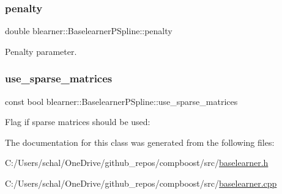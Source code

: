 \subsubsection{\texorpdfstring{penalty}{penalty}}
{\footnotesize\ttfamily double blearner\+::\+Baselearner\+P\+Spline\+::penalty\hspace{0.3cm}{\ttfamily [private]}}



Penalty parameter. 

\mbox{\label{classblearner_1_1_baselearner_p_spline_abc38580ee231aa0173fdea22bb9b2283}} 
\subsubsection{\texorpdfstring{use\+\_\+sparse\+\_\+matrices}{use\_sparse\_matrices}}
{\footnotesize\ttfamily const bool blearner\+::\+Baselearner\+P\+Spline\+::use\+\_\+sparse\+\_\+matrices\hspace{0.3cm}{\ttfamily [private]}}



Flag if sparse matrices should be used\+: 



The documentation for this class was generated from the following files\+:\begin{DoxyCompactItemize}
\item 
C\+:/\+Users/schal/\+One\+Drive/github\+\_\+repos/compboost/src/\mbox{\hyperlink{baselearner_8h}{baselearner.\+h}}\item 
C\+:/\+Users/schal/\+One\+Drive/github\+\_\+repos/compboost/src/\mbox{\hyperlink{baselearner_8cpp}{baselearner.\+cpp}}\end{DoxyCompactItemize}

